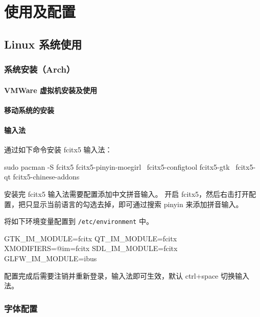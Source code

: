 \chapter{使用及配置}

\section{Linux 系统使用}

\subsection{系统安装（Arch）}

\subsubsection{VMWare 虚拟机安装及使用}

\subsubsection{移动系统的安装}

\subsubsection{输入法}

通过如下命令安装 fcitx5 输入法：

\begin{lstcode}
  sudo pacman -S fcitx5 fcitx5-pinyin-moegirl \
        fcitx5-configtool fcitx5-gtk \
        fcitx5-qt fcitx5-chinese-addons
\end{lstcode}

安装完 fcitx5 输入法需要配置添加中文拼音输入。
开启 fcitx5，然后右击打开配置，把只显示当前语言的勾选去掉，即可通过搜索 pinyin 来添加拼音输入。


将如下环境变量配置到 \lstinline{/etc/environment} 中。

\begin{lstcode}
  GTK_IM_MODULE=fcitx
  QT_IM_MODULE=fcitx
  XMODIFIERS=@im=fcitx
  SDL_IM_MODULE=fcitx
  GLFW_IM_MODULE=ibus
\end{lstcode}

配置完成后需要注销并重新登录，输入法即可生效，默认 ctrl+space 切换输入法。

\subsection{字体配置}

